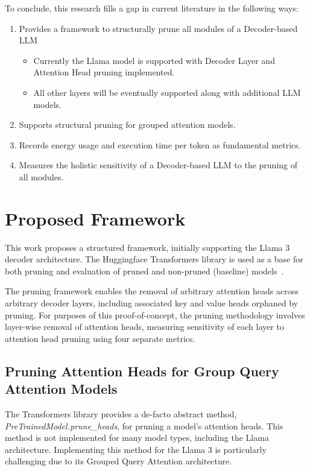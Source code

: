 \documentclass[conference]{IEEEtran}
\begin{document}
    To conclude, this research fills a gap in current literature in the following ways:

    \begin{enumerate}
        \item Provides a framework to structurally prune all modules of a Decoder-based LLM
        \begin{itemize}
            \item Currently the Llama model is supported with Decoder Layer and Attention Head pruning implemented.
            \item All other layers will be eventually supported along with additional LLM models.
        \end{itemize}
        \item Supports structural pruning for grouped attention models.
        \item Records energy usage and execution time per token as fundamental metrics.
        \item Measures the holistic sensitivity of a Decoder-based LLM to the pruning of all modules.
    \end{enumerate}

    \section{Proposed Framework}
    This work proposes a structured framework, initially supporting the Llama 3 decoder architecture.
    The Huggingface Transformers library is used as a base for both pruning and evaluation of pruned and non-pruned
    (baseline) models~\cite{wolf2020huggingfacestransformersstateoftheartnatural}.

    The pruning framework enables the removal of arbitrary attention heads across arbitrary decoder layers,
    including associated key and value heads orphaned by pruning.
    For purposes of this proof-of-concept, the pruning methodology involves layer-wise removal of attention heads,
    measuring sensitivity of each layer to attention head pruning using four separate metrics.

    \subsection{Pruning Attention Heads for Group Query Attention Models}

    The Transformers library provides a de-facto abstract method, \textit{PreTrainedModel.prune\_heads}, for pruning a model's attention heads.
    This method is not implemented for many model types, including the Llama architecture.
    Implementing this method for the Llama 3 is particularly challenging due to its Grouped Query Attention architecture.
\end{document}
